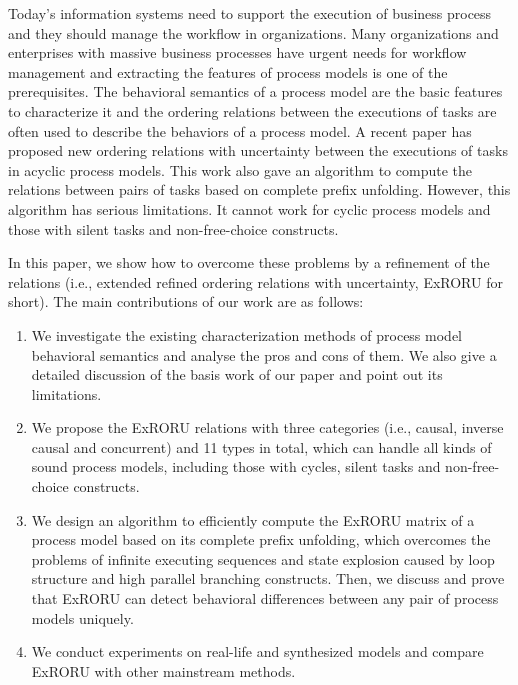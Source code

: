 \begin{eabstract}
Today's information systems need to support the execution of business process and they should manage the workflow in organizations. Many organizations and enterprises with massive business processes have urgent needs for workflow management and extracting the features of process models is one of the prerequisites. The behavioral semantics of a process model are the basic features to characterize it and the ordering relations between the executions of tasks are often used to describe the behaviors of a process model. A recent paper has proposed new ordering relations with uncertainty between the executions of tasks in acyclic process models. This work also gave an algorithm to compute the relations between pairs of tasks based on complete prefix unfolding. However, this algorithm has serious limitations. It cannot work for cyclic process models and those with silent tasks and non-free-choice constructs.

In this paper, we show how to overcome these problems by a refinement of the relations (i.e., extended refined ordering relations with uncertainty, ExRORU for short). The main contributions of our work are as follows:
\begin{enumerate}[1.]
  \item We investigate the existing characterization methods of process model behavioral semantics and analyse the pros and cons of them. We also give a detailed discussion of the basis work of our paper and point out its limitations.
  \item We propose the ExRORU relations with three categories (i.e., causal, inverse causal and concurrent) and 11 types in total, which can handle all kinds of sound process models, including those with cycles, silent tasks and non-free-choice constructs.
  \item We design an algorithm to efficiently compute the ExRORU matrix of a process model based on its complete prefix unfolding, which overcomes the problems of infinite executing sequences and state explosion caused by loop structure and high parallel branching constructs. Then, we discuss and prove that ExRORU can detect behavioral differences between any pair of process models uniquely.
  \item We conduct experiments on real-life and synthesized models and compare ExRORU with other mainstream methods.
\end{enumerate}
\end{eabstract}


